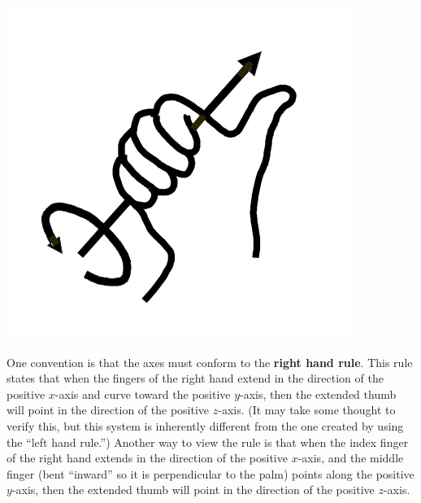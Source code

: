 {\centering
{}
\hspace{-2em}
\includegraphics[alt={ALT-TEXT-TO-BE-DETERMINED},width=.5\marginparwidth,angle=41,origin=c]{figures/raw/Right_hand_rule_simple.png}
\vspace{-2\baselineskip}}

One convention is that the axes must conform to the \textbf{right hand rule}. This rule states that when the fingers of the right hand extend in the direction of the positive $x$-axis and curve toward the positive $y$-axis, then the extended thumb will point in the direction of the positive $z$-axis. (It may take some thought to verify this, but this system is inherently different from the one created by using the ``left hand rule.'')
Another way to view the rule is that when the index finger of the right hand extends in the direction of the positive $x$-axis, and the middle finger (bent ``inward'' so it is perpendicular to the palm) points along the positive $y$-axis, then the extended thumb will point in the direction of the positive $z$-axis.%

